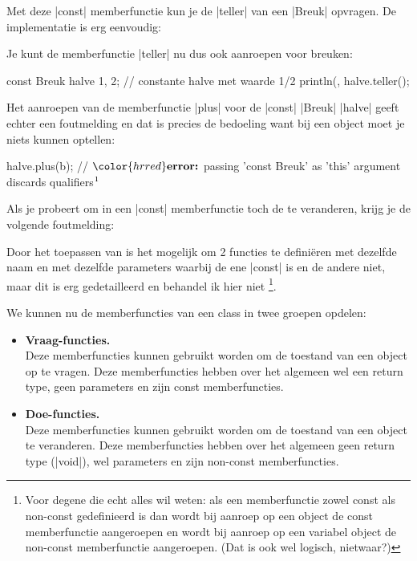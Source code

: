 \begin{cpplstShortInline}
Met deze |const| memberfunctie kun je de |teller| van een |Breuk| opvragen. De implementatie is erg eenvoudig:

Je kunt de memberfunctie |teller| nu dus ook aanroepen voor  breuken:
\begin{cpplstfragment}
    const Breuk halve {1, 2}; // constante halve met waarde 1/2
    println({}, halve.teller();
\end{cpplstfragment}

Het aanroepen van de memberfunctie |plus| voor de |const| |Breuk| |halve| geeft echter een foutmelding en dat is precies de bedoeling want bij een  object moet je niets kunnen optellen:
\begin{cpplstfragment}[mathescape=true]
    halve.plus(b); 
//  $\color{hrred}\textbf{error:}$ passing 'const Breuk' as 'this' argument discards qualifiers$\footnotemark$
\end{cpplstfragment}


Als je probeert om in een |const| memberfunctie toch de  te veranderen, krijg je de volgende foutmelding:
\begin{cpplstfragment}[mathescape=true]
int Breuk::teller() const {
    boven = 1; // teller probeert vals te spelen
//  $\color{hrred}\textbf{error:}$ assignment of member 'Breuk::boven' in read-only object
\end{cpplstfragment}

Door het toepassen van  is het mogelijk om 2 functies te definiëren met dezelfde naam en met dezelfde parameters waarbij de ene |const| is en de andere niet, maar dit is erg gedetailleerd en behandel ik hier niet%
\footnote{%
    Voor degene die echt alles wil weten: als een memberfunctie zowel const als non-const gedefinieerd is dan wordt bij aanroep op een  object de const memberfunctie aangeroepen en wordt bij aanroep op een variabel object de non-const memberfunctie aangeroepen. 
    (Dat is ook wel logisch, nietwaar?)
}.

We kunnen nu de memberfuncties van een class in twee groepen opdelen:
\begin{itemize}
    \item \label{vraagfuncties}\textbf{Vraag-functies.}\\
	Deze memberfuncties kunnen gebruikt worden om de toestand van een object op te vragen. 
	Deze memberfuncties hebben over het algemeen wel een return type, geen parameters en zijn const memberfuncties.
    \item \label{doefuncties}\textbf{Doe-functies.}\\
	Deze memberfuncties kunnen gebruikt worden om de toestand van een object te veranderen. 
	Deze memberfuncties hebben over het algemeen geen return type (|void|), wel parameters en zijn non-const memberfuncties.
\end{itemize}


\end{cpplstShortInline}

